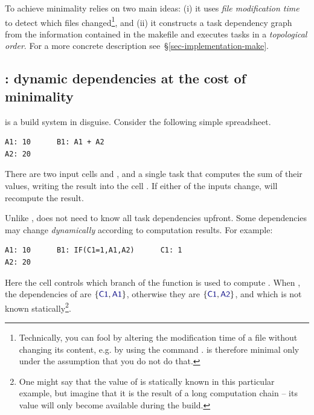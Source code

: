 \label{def-minimal}
\vspace{2mm}

To achieve minimality \Make relies on two main ideas: (i) it uses \emph{file
modification time} to detect which files changed\footnote{Technically, you
can fool \Make by altering the modification time of a file without changing its
content, e.g. by using the command . \Make is therefore minimal only
under the assumption that you do not do that.}, and (ii) it constructs a task
dependency graph from the information contained in the makefile and executes
tasks in a \emph{topological order}. For a more concrete description
see~\S\ref{sec-implementation-make}.

\subsection{\Excel: dynamic dependencies at the cost of minimality}
\label{sec-background-excel}

\Excel is a build system in disguise. Consider the following simple spreadsheet.

\vspace{1mm}
\begin{verbatim}
A1: 10      B1: A1 + A2
A2: 20
\end{verbatim}
\vspace{1mm}

\noindent
There are two input cells  and , and a single task that computes
the sum of their values, writing the result into the cell . If either of
the inputs change, \Excel will recompute the result.

Unlike \Make, \Excel does not need to know all task dependencies upfront. Some
dependencies may change \emph{dynamically} according to computation results. For
example:

\vspace{1mm}
\begin{verbatim}
A1: 10      B1: IF(C1=1,A1,A2)      C1: 1
A2: 20
\end{verbatim}
\vspace{1mm}

\noindent
Here the cell  controls which branch of the  function is used
to compute . When , the dependencies of  are
$\{\cmd{C1},\cmd{A1}\}$, otherwise they are $\{\cmd{C1},\cmd{A2}\}$, and which is
not known statically\footnote{One might say that the value of  is statically
known in this particular example, but imagine that it is the result of a long computation
chain -- its value will only become available during the build.}.

